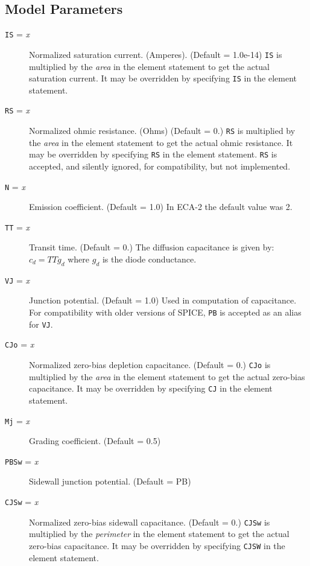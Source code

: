 \subsection{Model Parameters}

\begin{description}
  
\item[{\tt IS} = {\it x}] Normalized saturation current. (Amperes).
  (Default = 1.0e-14) {\tt IS} is multiplied by the {\it area} in the
  element statement to get the actual saturation current.  It may be
  overridden by specifying {\tt IS} in the element statement.
  
\item[{\tt RS} = {\it x}] Normalized ohmic resistance. (Ohms) (Default
  = 0.)  {\tt RS} is multiplied by the {\it area} in the element
  statement to get the actual ohmic resistance.  It may be overridden
  by specifying {\tt RS} in the element statement.  {\tt RS} is
  accepted, and silently ignored, for compatibility, but not
  implemented.
  
\item[{\tt N} = {\it x}] Emission coefficient. (Default = 1.0) In
  ECA-2 the default value was 2.
  
\item[{\tt TT} = {\it x}] Transit time. (Default = 0.)  The diffusion
  capacitance is given by: $c_d = TT g_d$ where $g_d$ is the diode
  conductance.
  
\item[{\tt VJ} = {\it x}] Junction potential.  (Default = 1.0) Used in
  computation of capacitance.  For compatibility with older versions
  of SPICE, {\tt PB} is accepted as an alias for {\tt VJ}.

\item[{\tt CJo} = {\it x}] Normalized zero-bias depletion capacitance.
  (Default = 0.)  {\tt CJo} is multiplied by the {\it area} in the
  element statement to get the actual zero-bias capacitance.  It may
  be overridden by specifying {\tt CJ} in the element statement.
  
\item[{\tt Mj} = {\it x}] Grading coefficient.  (Default = 0.5)
  
\item[{\tt PBSw} = {\it x}] Sidewall junction potential.  (Default =
  PB)
  
\item[{\tt CJSw} = {\it x}] Normalized zero-bias sidewall capacitance.
  (Default = 0.)  {\tt CJSw} is multiplied by the {\it perimeter} in
  the element statement to get the actual zero-bias capacitance.  It
  may be overridden by specifying {\tt CJSW} in the element statement.
  

\end{description}
